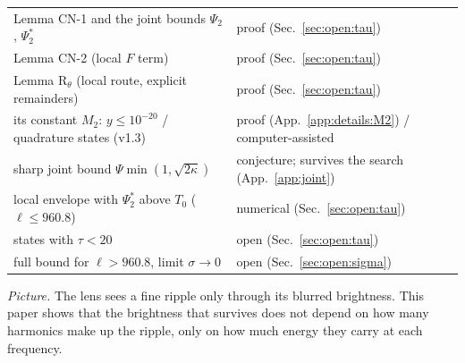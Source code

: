 \begin{table}
\begin{ruledtabular}
\begin{tabular}{p{}p{}}
Lemma CN-1 and the joint bounds $\Psi_2$, $\Psi_2^*$ & proof (Sec.~\ref{sec:open:tau})\\
Lemma CN-2 (local $F$ term) & proof (Sec.~\ref{sec:open:tau})\\
Lemma R$_\theta$ (local route, explicit remainders) & proof (Sec.~\ref{sec:open:tau})\\
its constant $M_2$: $y\le10^{-20}$ / quadrature states (v1.3) & proof (App.~\ref{app:details:M2}) / computer-assisted\\
sharp joint bound $\Psi\min(1,\sqrt{2\kappa})$ & conjecture; survives the search (App.~\ref{app:joint})\\
local envelope with $\Psi_2^*$ above $T_0$ ($\ell\le960.8$) & numerical (Sec.~\ref{sec:open:tau})\\
states with $\tau<20$ & open (Sec.~\ref{sec:open:tau})\\
full bound for $\ell>960.8$, limit $\sigma\to0$ & open (Sec.~\ref{sec:open:sigma})\\
\end{tabular}
\end{ruledtabular}
\end{table}

\emph{Picture.} The lens sees a fine ripple only through its blurred brightness.
This paper shows that the brightness that survives does not depend on how many harmonics make up the ripple, only on how much energy they carry at each frequency.
